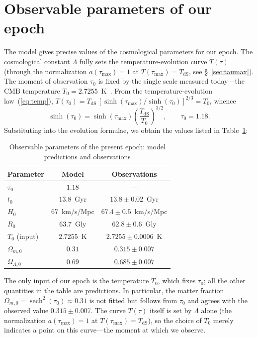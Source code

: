 \documentclass[10pt,a4paper]{article}
\begin{document}
\section{Observable parameters of our epoch}

The model gives precise values of the cosmological parameters for our epoch. The cosmological constant $\Lambda$ fully sets the temperature-evolution curve $T(\tau)$ (through the normalization $a(\tau_{\max})=1$ at $T(\tau_{\max})=T_{\mathrm{dS}}$, see \S~\ref{sec:taumax}). The moment of observation $\tau_0$ is fixed by the single scale measured today---the CMB temperature $T_0 = 2.7255$~K~\cite{Planck2018}. From the temperature-evolution law~(\ref{eq:temp}), $T(\tau_0) = T_{\mathrm{dS}}\,[\sinh(\tau_{\max})/\sinh(\tau_0)]^{2/3} = T_0$, whence
\begin{equation}
\sinh(\tau_0) = \sinh(\tau_{\max})\left(\frac{T_{\mathrm{dS}}}{T_0}\right)^{3/2}, \qquad \tau_0 = 1.18.
\end{equation}
Substituting into the evolution formulae, we obtain the values listed in Table~\ref{tab:observables}:

\begin{table}[htbp]
\centering
\caption{Observable parameters of the present epoch: model predictions and observations}
\label{tab:observables}
\begin{tabular}{l c c}
\hline
Parameter & Model & Observations \\
\hline
$\tau_0$ & $1.18$ & --- \\
$t_0$ & $13.8$~Gyr & $13.8 \pm 0.02$~Gyr \\
$H_0$ & $67$~km/s/Mpc & $67.4 \pm 0.5$~km/s/Mpc \\
$R_0$ & $63.7$~Gly & $62.8 \pm 0.6$~Gly \\
$T_0$ (input) & $2.7255$~K & $2.7255 \pm 0.0006$~K \\
$\Omega_{m,0}$ & $0.31$ & $0.315 \pm 0.007$ \\
$\Omega_{\Lambda,0}$ & $0.69$ & $0.685 \pm 0.007$ \\
\hline
\end{tabular}
\end{table}

The only input of our epoch is the temperature $T_0$, which fixes $\tau_0$; all the other quantities in the table are predictions. In particular, the matter fraction $\Omega_{m,0} = \operatorname{sech}^2(\tau_0) \approx 0.31$ is not fitted but follows from $\tau_0$ and agrees with the observed value $0.315 \pm 0.007$. The curve $T(\tau)$ itself is set by $\Lambda$ alone (the normalization $a(\tau_{\max})=1$ at $T(\tau_{\max})=T_{\mathrm{dS}}$), so the choice of $T_0$ merely indicates a point on this curve---the moment at which we observe.
\end{document}
